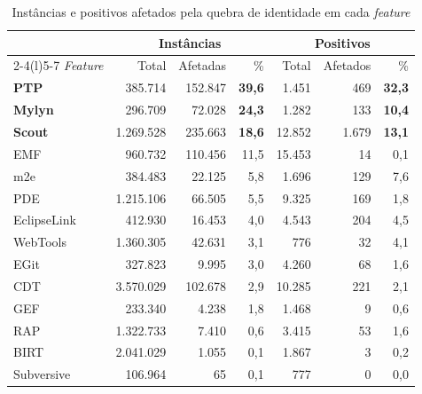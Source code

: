 \begin{table}[htbp]
    \centering
    \footnotesize
    \caption{Instâncias e positivos afetados pela quebra de identidade em cada \textit{feature}}
    \label{tab:met-identidade}
    \begin{tabular}{@{}lrrrrrr@{}}
        \toprule
        & \multicolumn{3}{c}{Instâncias} & \multicolumn{3}{c}{Positivos} \\
        \cmidrule(lr){2-4}\cmidrule(l){5-7}
        \textit{Feature} & Total & Afetadas & \% & Total & Afetados & \% \\
        \midrule
        \textbf{PTP}    & 385.714   & 152.847 & \textbf{39,6} & 1.451  & 469   & \textbf{32,3} \\
        \textbf{Mylyn}  & 296.709   & 72.028  & \textbf{24,3} & 1.282  & 133   & \textbf{10,4} \\
        \textbf{Scout}  & 1.269.528 & 235.663 & \textbf{18,6} & 12.852 & 1.679 & \textbf{13,1} \\
        EMF             & 960.732   & 110.456 & 11,5 & 15.453 & 14    & 0,1  \\
        m2e             & 384.483   & 22.125  & 5,8  & 1.696  & 129   & 7,6  \\
        PDE             & 1.215.106 & 66.505  & 5,5  & 9.325  & 169   & 1,8  \\
        EclipseLink     & 412.930   & 16.453  & 4,0  & 4.543  & 204   & 4,5  \\
        WebTools        & 1.360.305 & 42.631  & 3,1  & 776    & 32    & 4,1  \\
        EGit            & 327.823   & 9.995   & 3,0  & 4.260  & 68    & 1,6  \\
        CDT             & 3.570.029 & 102.678 & 2,9  & 10.285 & 221   & 2,1  \\
        GEF             & 233.340   & 4.238   & 1,8  & 1.468  & 9     & 0,6  \\
        RAP             & 1.322.733 & 7.410   & 0,6  & 3.415  & 53    & 1,6  \\
        BIRT            & 2.041.029 & 1.055   & 0,1  & 1.867  & 3     & 0,2  \\
        Subversive      & 106.964   & 65      & 0,1  & 777    & 0     & 0,0  \\

\end{tabular}
\end{table}
